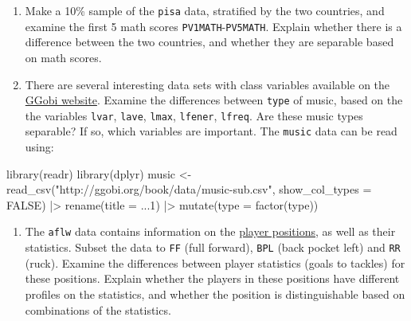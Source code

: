 \documentclass[
  letterpaper,
]{krantz}
\newenvironment{Shaded}{\begin{snugshade}}{\end{snugshade}}
\newcommand{\AttributeTok}[1]{\textcolor[rgb]{0.40,0.45,0.13}{#1}}
\newcommand{\ConstantTok}[1]{\textcolor[rgb]{0.56,0.35,0.01}{#1}}
\newcommand{\FunctionTok}[1]{\textcolor[rgb]{0.28,0.35,0.67}{#1}}
\newcommand{\NormalTok}[1]{\textcolor[rgb]{0.00,0.23,0.31}{#1}}
\newcommand{\OtherTok}[1]{\textcolor[rgb]{0.00,0.23,0.31}{#1}}
\newcommand{\SpecialCharTok}[1]{\textcolor[rgb]{0.37,0.37,0.37}{#1}}
\newcommand{\StringTok}[1]{\textcolor[rgb]{0.13,0.47,0.30}{#1}}
\providecommand{\tightlist}{%
  \setlength{\itemsep}{0pt}\setlength{\parskip}{0pt}}\usepackage{longtable,booktabs,array}
\begin{document}
\begin{enumerate}
\def\labelenumi{\arabic{enumi}.}
\setcounter{enumi}{1}
\item
  Make a 10\% sample of the \texttt{pisa} data, stratified by the two
  countries, and examine the first 5 math scores
  \texttt{PV1MATH}-\texttt{PV5MATH}. Explain whether there is a
  difference between the two countries, and whether they are separable
  based on math scores.
\item
  There are several interesting data sets with class variables available
  on the \href{http://ggobi.org/book/index.html}{GGobi website}. Examine
  the differences between \texttt{type} of music, based on the the
  variables \texttt{lvar}, \texttt{lave}, \texttt{lmax},
  \texttt{lfener}, \texttt{lfreq}. Are these music types separable? If
  so, which variables are important. The \texttt{music} data can be read
  using:
\end{enumerate}

\begin{Shaded}
\begin{Highlighting}[]
\FunctionTok{library}\NormalTok{(readr)}
\FunctionTok{library}\NormalTok{(dplyr)}
\NormalTok{music }\OtherTok{\textless{}{-}} \FunctionTok{read\_csv}\NormalTok{(}\StringTok{"http://ggobi.org/book/data/music{-}sub.csv"}\NormalTok{,}
                  \AttributeTok{show\_col\_types =} \ConstantTok{FALSE}\NormalTok{) }\SpecialCharTok{|\textgreater{}}
  \FunctionTok{rename}\NormalTok{(}\AttributeTok{title =} \StringTok{\textasciigrave{}}\AttributeTok{...1}\StringTok{\textasciigrave{}}\NormalTok{) }\SpecialCharTok{|\textgreater{}}
  \FunctionTok{mutate}\NormalTok{(}\AttributeTok{type =} \FunctionTok{factor}\NormalTok{(type))}
\end{Highlighting}
\end{Shaded}

\begin{enumerate}
\def\labelenumi{\arabic{enumi}.}
\setcounter{enumi}{3}
\tightlist
\item
  The \texttt{aflw} data contains information on the
  \href{https://en.wikipedia.org/wiki/Australian_rules_football_positions}{player
  positions}, as well as their statistics. Subset the data to
  \texttt{FF} (full forward), \texttt{BPL} (back pocket left) and
  \texttt{RR} (ruck). Examine the differences between player statistics
  (goals to tackles) for these positions. Explain whether the players in
  these positions have different profiles on the statistics, and whether
  the position is distinguishable based on combinations of the
  statistics.
\end{enumerate}
\end{document}
